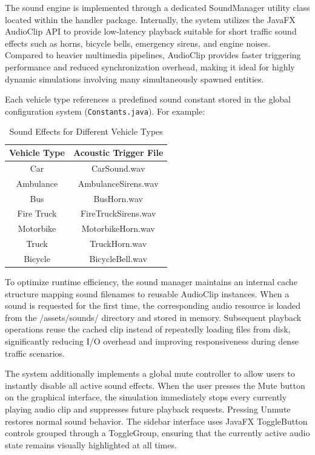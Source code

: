 \documentclass[../report_main.tex]{subfiles}
\begin{document}
The sound engine is implemented through a dedicated SoundManager utility class located within the handler package. Internally, the system utilizes the JavaFX AudioClip API to provide low-latency playback suitable for short traffic sound effects such as horns, bicycle bells, emergency sirens, and engine noises. Compared to heavier multimedia pipelines, AudioClip provides faster triggering performance and reduced synchronization overhead, making it ideal for highly dynamic simulations involving many simultaneously spawned entities.

Each vehicle type references a predefined sound constant stored in the global configuration system (\texttt{Constants.java}). For example:

\begin{table}[H]
  \centering
  \begin{tabular}{|c|c|}
    \hline
    \textbf{Vehicle Type} & \textbf{Acoustic Trigger File} \\
    \hline
    Car & CarSound.wav\\
    \hline
    Ambulance & AmbulanceSirens.wav \\
    \hline
    Bus & BusHorn.wav \\
    \hline
    Fire Truck & FireTruckSirens.wav \\
    \hline
    Motorbike & MotorbikeHorn.wav \\
    \hline
    Truck & TruckHorn.wav \\
    \hline
    Bicycle & BicycleBell.wav \\
    \hline
  \end{tabular}
  \caption{Sound Effects for Different Vehicle Types}
  \label{tab:vehicle_sounds}
\end{table}

To optimize runtime efficiency, the sound manager maintains an internal cache structure mapping sound filenames to reusable AudioClip instances. When a sound is requested for the first time, the corresponding audio resource is loaded from the /assets/sounds/ directory and stored in memory. Subsequent playback operations reuse the cached clip instead of repeatedly loading files from disk, significantly reducing I/O overhead and improving responsiveness during dense traffic scenarios.

The system additionally implements a global mute controller to allow users to instantly disable all active sound effects. When the user presses the Mute button on the graphical interface, the simulation immediately stops every currently playing audio clip and suppresses future playback requests. Pressing Unmute restores normal sound behavior. The sidebar interface uses JavaFX ToggleButton controls grouped through a ToggleGroup, ensuring that the currently active audio state remains visually highlighted at all times.
\end{document}

